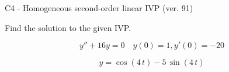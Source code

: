 \begin{exercise}
  \begin{exerciseTitle}C4 - Homogeneous second-order linear IVP (ver. 91)\end{exerciseTitle}
  \begin{exerciseStatement}
    
Find the solution to the given IVP.

    
\[y''+16y = 0 \hspace{1em} y(0) = 1 , y'(0) = -20\]

  \end{exerciseStatement}
  \begin{exerciseAnswer}
    
\[y= \cos\left(4 \, t\right) - 5 \, \sin\left(4 \, t\right)\]

  \end{exerciseAnswer}
\end{exercise}